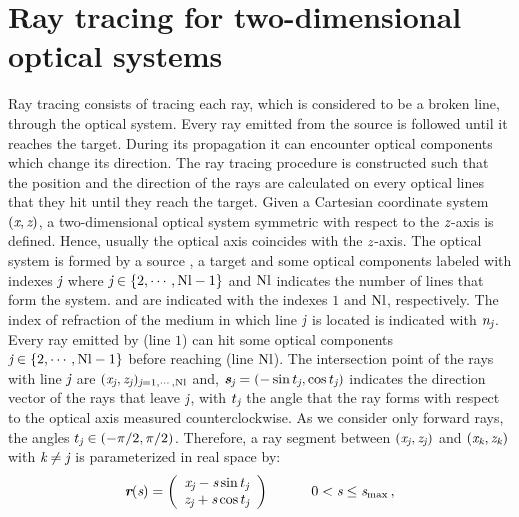 \section{Ray tracing for two-dimensional optical systems}\label{sec:raytracing}
Ray tracing consists of tracing each ray, which is considered to be a broken line, through the optical system. 
Every ray emitted from the source is followed until it reaches the target. During its propagation it can encounter optical components which change its direction. The ray tracing procedure is constructed such that the position and the direction of the rays are calculated on every optical lines that they hit until they reach the target.
Given a Cartesian coordinate system $(\textit{x}, \textit{z})$, a two-dimensional optical system symmetric with respect to the $\textit{z}$-axis is defined.
Hence, usually the optical axis coincides with the $\textit{z}$-axis.
The optical system is formed by a source , a target   and some optical components labeled with indexes $\textit{j}$ where $\textit{j} \in \{2, \cdots, \textrm{Nl}-1\}$ and $\textrm{Nl}$
 indicates the number of lines that form the system.  and  are indicated with the indexes $1$ and $\textrm{Nl}$, respectively.
The index of refraction of the medium in which line $\textit{j}$ is located is indicated with $\textit{n}_{\textit{j}}$.
Every ray emitted by  (line $1$) can hit some optical components $\textit{j}\in\{2, \cdots, \textrm{Nl} -1\}$ before reaching  (line $\textrm{Nl}$).
The intersection point of the rays with line $\textit{j}$ are $(\textit{x}_{\textit{j}}, \textit{z}_{\textit{j}})_{\textit{j} =1, \cdots, \textrm{Nl}}$ and, $\textit{\textbf{s}}_{\textit{j}}= (-\sin t_{\textit{j}}, \cos t_{\textit{j}})$ indicates the direction vector of the rays that leave $\textit{j}$,
with $t_{\textit{j}}$ the angle that the ray forms with respect to the optical axis measured counterclockwise. As we consider only forward rays, the angles
$t_{\textit{j}}\in (-\pi/2, \pi/2)$.
Therefore, a ray segment between $(\textit{x}_{\textit{j}}, \textit{z}_{\textit{j}})$ and $(\textit{x}_{\textit{k}}, \textit{z}_{\textit{k}})$
with $\textit{k}\neq\textit{j}$ is parameterized in real space by:
\begin{equation}
\label{parametrization}
\textit{\textbf{r}}(\textit{s})=
\left( \begin{array}{cc}
\textit{x}_{\textit{j}}-\textit{s}\sin t_{\textit{j}} \\
\textit{z}_{\textit{j}}+\textit{s}\cos t_{\textit{j}}\end{array} \right) \qquad \quad 0< \textit{s}\leq \textit{s}_{\textrm{max}}\,,
\end{equation}
